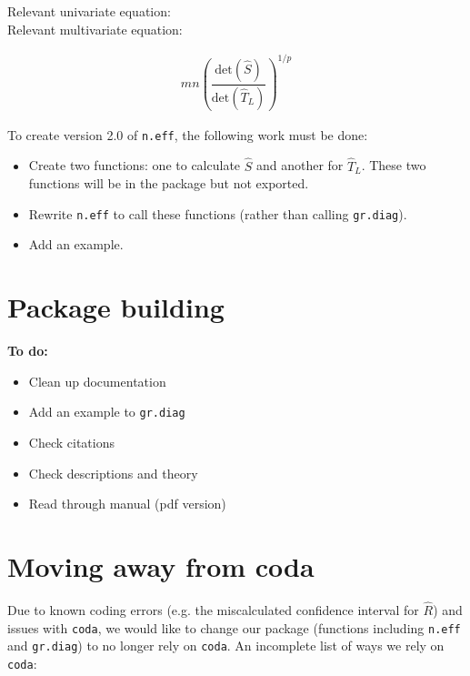\documentclass[12pt]{article}
\theoremstyle{remark}
\begin{document}
Relevant univariate equation: \\

Relevant multivariate equation:

\begin{align*}
m n \left( \dfrac{\text{det}(\hat{S})}{\text{det}(\hat{T}_L)} \right)^{1/p}
\end{align*}

To create version 2.0 of \texttt{n.eff}, the following work must be done:

\begin{itemize}
 \renewcommand{\labelitemi}{$\square$}
\item Create two functions: one to calculate $\hat{S}$ and another for $\hat{T}_L$. These two functions will be in the package but not exported. 
\item Rewrite \texttt{n.eff} to call these functions (rather than calling \texttt{gr.diag}).

\item Add an example.

\end{itemize}





\section{\textbf{Package building}}
\textbf{To do:}
\begin{itemize}
 \renewcommand{\labelitemi}{$\square$}
\item Clean up documentation
\item Add an example to \texttt{gr.diag} 
\item Check citations
\item Check descriptions and theory
\item Read through manual (pdf version)
\end{itemize}



\section{\textbf{Moving away from coda}}

Due to known coding errors (e.g. the miscalculated confidence interval for $\hat{R}$) and issues with \texttt{coda}, we would like to change our package (functions including \texttt{n.eff} and \texttt{gr.diag}) to no longer rely on \texttt{coda}. An incomplete list of ways we rely on  \texttt{coda}: 
\end{document}
